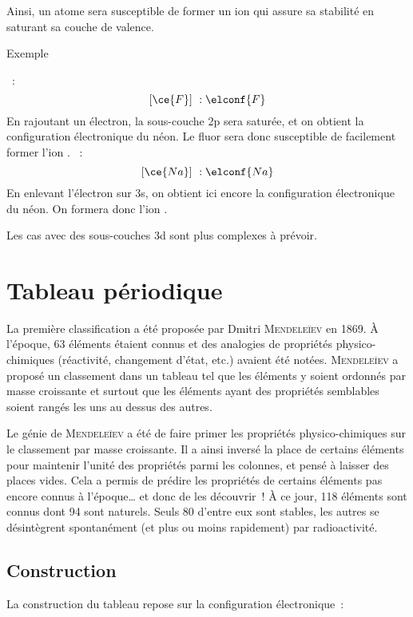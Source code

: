 \documentclass[../main/main.tex]{subfiles}
\begin{document}
Ainsi, un atome sera susceptible de former un ion qui assure sa stabilité en
saturant sa couche de valence.

\begin{rexem}{Exemple}
    \begin{itemize}[label=$\diamond$, leftmargin=20pt]
        ~:
            \[[\ce{F}]~: \elconf{F}\]
            En rajoutant un électron, la sous-couche 2p sera saturée, et on
            obtient la configuration électronique du néon. Le fluor sera donc
            susceptible de facilement former l'ion .
        ~:
            \[[\ce{Na}]~: \elconf{Na}\]
            En enlevant l'électron sur 3s, on obtient ici encore la
            configuration électronique du néon. On formera donc l'ion .
    \end{itemize}
\end{rexem}

Les cas avec des sous-couches 3d sont plus complexes à prévoir.

\section{Tableau périodique}

La première classification a été proposée par Dmitri \textsc{Mendeleïev} en
1869. À l'époque, 63 éléments étaient connus et des analogies de propriétés
physico-chimiques (réactivité, changement d'état, etc.) avaient été notées.
\textsc{Mendeleïev} a proposé un classement dans un tableau tel que les éléments
y soient ordonnés par masse croissante et surtout que les éléments ayant des
propriétés semblables soient rangés les uns au dessus des autres.

Le génie de \textsc{Mendeleïev} a été de faire primer les propriétés
physico-chimiques sur le classement par masse croissante. Il a ainsi inversé la
place de certains éléments pour maintenir l'unité des propriétés parmi les
colonnes, et pensé à laisser des places vides. Cela a permis de prédire les
propriétés de certains éléments pas encore connus à l'époque… et donc de les
découvrir~! À ce jour, 118 éléments sont connus dont 94 sont naturels. Seuls 80
d'entre eux sont stables, les autres se désintègrent spontanément (et plus ou
moins rapidement) par radioactivité.

\subsection{Construction}
La construction du tableau repose sur la configuration électronique~:
\end{document}

